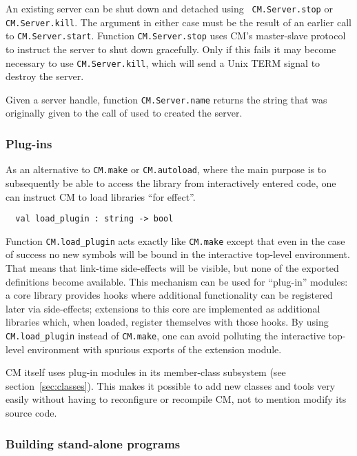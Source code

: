 \documentclass[titlepage,letterpaper]{article}
\begin{document}
An existing server can be shut down and detached using {\tt
CM.Server.stop} or {\tt CM.Server.kill}.  The argument in either case
must be the result of an earlier call to {\tt CM.Server.start}.
Function {\tt CM.Server.stop} uses CM's master-slave protocol to
instruct the server to shut down gracefully.  Only if this fails it
may become necessary to use {\tt CM.Server.kill}, which will send a
Unix TERM signal to destroy the server.

Given a server handle, function {\tt CM.Server.name} returns the
string that was originally given to the call of used to created the server.

\subsubsection*{Plug-ins}

As an alternative to {\tt CM.make} or {\tt CM.autoload}, where the
main purpose is to subsequently be able to access the library from
interactively entered code, one can instruct CM to load libraries
``for effect''.

\begin{verbatim}
  val load_plugin : string -> bool
\end{verbatim}

Function {\tt CM.load\_plugin} acts exactly like {\tt CM.make} except
that even in the case of success no new symbols will be bound in the
interactive top-level environment.  That means that link-time
side-effects will be visible, but none of the exported definitions
become available.  This mechanism can be used for ``plug-in'' modules:
a core library provides hooks where additional functionality can be
registered later via side-effects; extensions to this core are
implemented as additional libraries which, when loaded, register
themselves with those hooks.  By using {\tt CM.load\_plugin} instead
of {\tt CM.make}, one can avoid polluting the interactive top-level
environment with spurious exports of the extension module.

CM itself uses plug-in modules in its member-class subsystem (see
section~\ref{sec:classes}).  This makes it possible to add new classes
and tools very easily without having to reconfigure or recompile CM,
not to mention modify its source code.

\subsubsection*{Building stand-alone programs}
\end{document}
